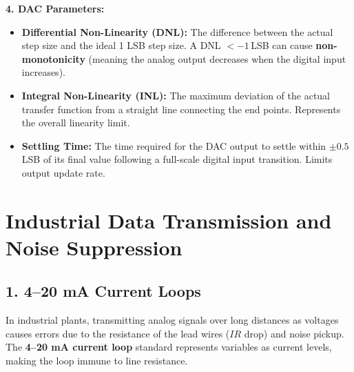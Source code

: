 \documentclass[12pt,a4paper]{article}
\begin{document}
\textbf{4. DAC Parameters:}
\begin{itemize}[leftmargin=*, itemsep=2.5pt]
  \item \textbf{Differential Non-Linearity (DNL):} The difference between the actual step size and the ideal 1 LSB step size. A DNL $< -1\,$LSB can cause \textbf{non-monotonicity} (meaning the analog output decreases when the digital input increases).
  \item \textbf{Integral Non-Linearity (INL):} The maximum deviation of the actual transfer function from a straight line connecting the end points. Represents the overall linearity limit.
  \item \textbf{Settling Time:} The time required for the DAC output to settle within $\pm 0.5\,$LSB of its final value following a full-scale digital input transition. Limits output update rate.
\end{itemize}

\section{Industrial Data Transmission and Noise Suppression}

\subsection{1. 4--20 mA Current Loops}
In industrial plants, transmitting analog signals over long distances as voltages causes errors due to the resistance of the lead wires ($I R$ drop) and noise pickup. The \textbf{4--20 mA current loop} standard represents variables as current levels, making the loop immune to line resistance.
\end{document}
